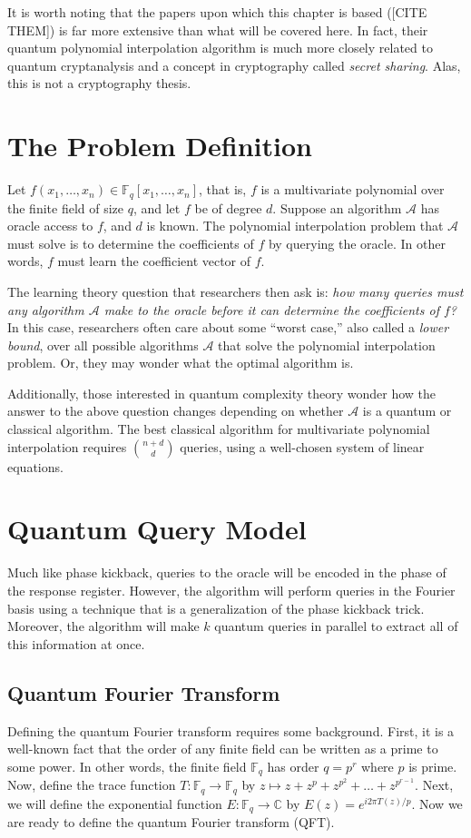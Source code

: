 \documentclass[12pt,twoside]{reedthesis}
\theoremstyle{definition}
\newcommand{\C}{\mathbb{C}}
\newcommand{\F}{\mathbb{F}}
\begin{document}
It is worth noting that the papers upon which this chapter is based ([CITE THEM]) is far more extensive than what will be covered here. In fact, their quantum polynomial interpolation algorithm is much more closely related to quantum cryptanalysis and a concept in cryptography called \textit{secret sharing}. Alas, this is not a cryptography thesis.

\section{The Problem Definition}
Let $f(x_1, \ldots, x_n)\in \F_q[x_1, \ldots, x_n]$, that is, $f$ is a multivariate polynomial over the finite field of size $q$, and let $f$ be of degree $d$. Suppose an algorithm $\mathcal{A}$ has oracle access to $f$, and $d$ is known. The polynomial interpolation problem that $\mathcal{A}$ must solve is to determine the coefficients of $f$ by querying the oracle. In other words, $f$ must learn the coefficient vector of $f$.

The learning theory question that researchers then ask is: \textit{how many queries must any algorithm $\mathcal{A}$ make to the oracle before it can determine the coefficients of $f$?} In this case, researchers often care about some ``worst case,'' also called a \textit{lower bound}, over all possible algorithms $\mathcal{A}$ that solve the polynomial interpolation problem. Or, they may wonder what the optimal algorithm is. 

Additionally, those interested in quantum complexity theory wonder how the answer to the above question changes depending on whether $\mathcal{A}$ is a quantum or classical algorithm. The best classical algorithm for multivariate polynomial interpolation requires ${n+d \choose d}$ queries, using a well-chosen system of linear equations.

\section{Quantum Query Model}
Much like phase kickback, queries to the oracle will be encoded in the phase of the response register. However, the algorithm will perform queries in the Fourier basis using a technique that is a generalization of the phase kickback trick. Moreover, the algorithm will make $k$ quantum queries in parallel to extract all of this information at once.

\subsection{Quantum Fourier Transform}
Defining the quantum Fourier transform requires some background. First, it is a well-known fact that the order of any finite field can be written as a prime to some power. In other words, the finite field $\F_q$ has order $q = p^r$ where $p$ is prime. Now, define the trace function $T: \F_q \rightarrow \F_q$ by $z \mapsto z + z^p + z^{p^2} + \ldots + z^{p^{r-1}}$. Next, we will define the exponential function $E: \F_q \rightarrow \C$ by $E(z) = e^{i2\pi T(z)/p}$. Now we are ready to define the quantum Fourier transform (QFT).
\end{document}
